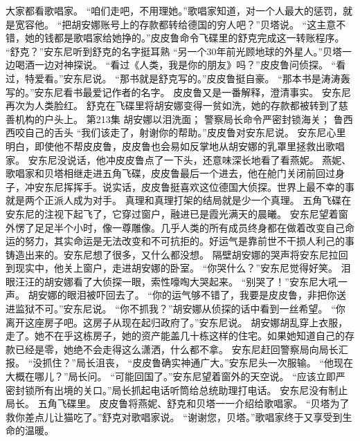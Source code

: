 \documentclass[a4paper,12pt,UTF8,twoside]{ctexbook}
\begin{document}
        大家都看歌唱家。 
        “咱们走吧，不用理她。”歌唱家知道，对一个人最大的惩罚，就是宽容他。 
        “把胡安娜账号上的存款都转给德国的穷人吧？”贝塔说。 
        “这主意不错，她的钱都是歌唱家给她挣的。”皮皮鲁命令飞碟里的舒克完成这一转账程序。 
        “舒克？”安东尼听到舒克的名字挺耳熟 
        “另一个30年前光顾地球的外星人。”贝塔一边喝酒一边对神探说。 
        “看过《人类，我是你的朋友》吗？”皮皮鲁问侦探。 
        “看过，特爱看。”安东尼说。 
        “那书就是舒克写的。”皮皮鲁挺自豪。 
        “那本书是涛涛轰写的。”安东尼看书最爱记作者的名字。 
        皮皮鲁又是一番解释，澄清事实。 
        安东尼再次为人类脸红。 
        舒克在飞碟里将胡安娜变得一贫如洗，她的存款都被转到了慈善机构的户头上。   第213集 
        胡安娜以泪洗面； 
        警察局长命令严密封锁海关； 
        鲁西西咬自己的舌头   
        “我们该走了，射谢你的帮助。”皮皮鲁对安东尼说。 
        安东尼心里明白，即使他不帮皮皮鲁，皮皮鲁也会易如反掌地从胡安娜的乳罩里拯救出歌唱家。 
        安东尼没说话，他冲皮皮鲁点了一下头，还意味深长地看了看燕妮。 
        燕妮、歌唱家和贝塔相继走进五角飞碟，皮皮鲁最后一个进去，他在舱门关闭前回过身子，冲安东尼挥挥手。说实话，皮皮鲁挺喜欢这位德国大侦探。世界上最不幸的事就是两个正派人成为对手。 
        真理和真理打架的结局就是少一个真理。 
        五角飞碟在安东尼的注视下起飞了，它穿过窗户，融进已是霞光满天的晨曦。 
        安东尼望着窗外愣了足足半个小时，像一尊雕像。几乎人类的所有成员终身都在做着改变自己命运的努力，其实命运是无法改变和不可抗拒的。好运气是靠前世不干损人利己的事铸造出来的。安东尼想了很多，又什么都没想。 
        隔壁胡安娜的哭声将安东尼拉回到现实中，他关上窗户，走进胡安娜的卧室。 
        “你哭什么？”安东尼觉得好笑。 
        泪眼汪汪的胡安娜看了大侦探一眼，索性嚎啕大哭起来。 
        “别哭了！”安东尼大吼一声。 
        胡安娜的眼泪被吓回去了。 
        “你的运气够不错了，我要是皮皮鲁，非把你送进监狱不可。”安东尼说。 
        “你不抓我？”胡安娜从侦探的话中看到一丝希望。 
        “你离开这座房子吧。这房子从现在起归政府了。”安东尼说。 
        胡安娜胡乱穿上衣服，走了。她不在乎这栋房子，她的资产能盖几十栋这样的住宅。如果她知道自己的存款已经是零，她绝不会走得这么潇洒，什么都不拿。 
        安东尼赶回警察局向局长汇报。 
       “没抓住？”局长沮丧， 
        “皮皮鲁确实神通广大。”安东尼头一次服输。 
        “他现在大概在哪儿？”局长问。 
        “可能回国了。”安东尼望着窗外的天空说。 
        “应该立即严密封锁所有出境的关口。”局长抓起电话听筒给总统助理打电话。 
        安东尼没有制止局长。 
        五角飞碟里。 
        皮皮鲁将燕妮、舒克和贝塔一一介绍给歌唱家。 
        “贝塔为了救你差点儿让猫吃了。”舒克对歌唱家说。 
        “谢谢您，贝塔。”歌唱家终于又享受到生命的温暖。 
\end{document}
